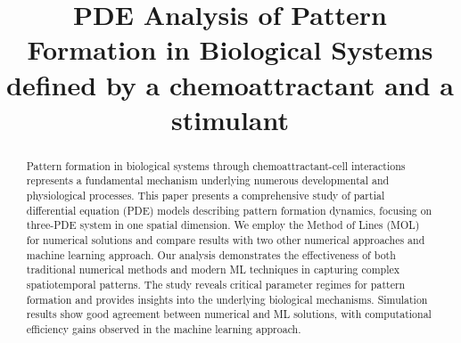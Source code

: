 \documentclass[conference]{IEEEtran}
\begin{document}
\title{PDE Analysis of Pattern Formation in Biological Systems defined by a chemoattractant and a stimulant}

\author{
}

\maketitle

\begin{abstract}
Pattern formation in biological systems through chemoattractant-cell interactions represents a fundamental mechanism underlying numerous developmental and physiological processes. This paper presents a comprehensive study of partial differential equation (PDE) models describing pattern formation dynamics, focusing on three-PDE system in one spatial dimension. We employ the Method of Lines (MOL) for numerical solutions and compare results with two other numerical approaches and machine learning approach. Our analysis demonstrates the effectiveness of both traditional numerical methods and modern ML techniques in capturing complex spatiotemporal patterns. The study reveals critical parameter regimes for pattern formation and provides insights into the underlying biological mechanisms. Simulation results show good agreement between numerical and ML solutions, with computational efficiency gains observed in the machine learning approach.
\end{abstract}
\end{document}
